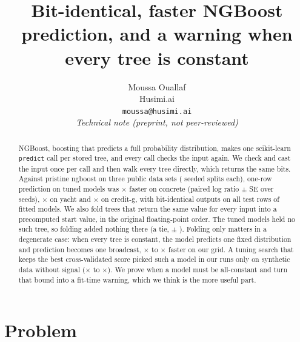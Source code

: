 \documentclass{article}
\title{Bit-identical, faster NGBoost prediction, and a warning when every tree is constant}
\author{%
  Moussa Ouallaf \\
  Husimi.ai \\
  \texttt{moussa@husimi.ai} \\
  \textit{Technical note (preprint, not peer-reviewed)}
}
\begin{document}
\maketitle
\vspace{-1.6em}

\begin{abstract}
NGBoost, boosting that predicts a full probability distribution, makes one scikit-learn \texttt{predict} call per stored tree, and every call checks the input again.
We check and cast the input once per call and then walk every tree directly, which returns the same bits.
Against pristine ngboost \nVerNgboost{} on three public data sets (\nConcreteSeeds{} seeded splits each), one-row prediction on tuned models was \nConcreteOnePristineX$\times$ faster on concrete (paired log ratio \nConcreteOnePristineLog{} $\pm$ \nConcreteOnePristineSE{} SE over seeds), \nYachtOnePristineX$\times$ on yacht and \nCreditGOnePristineX$\times$ on credit-g, with bit-identical outputs on all \nEqRowsTotal{} test rows of \nEqModelsTotal{} fitted models.
We also fold trees that return the same value for every input into a precomputed start value, in the original floating-point order. The tuned models held no such tree, so folding added nothing there (a tie, \nConcreteOneDirectLog{} $\pm$ \nConcreteOneDirectSE).
Folding only matters in a degenerate case: when every tree is constant, the model predicts one fixed distribution and prediction becomes one broadcast, \nCreditGGridDegMinX$\times$ to \nYachtGridDegMaxX$\times$ faster on our grid. A tuning search that keeps the best cross-validated score picked such a model in our runs only on synthetic data without signal (\nLowMinX$\times$ to \nLowMaxX$\times$).
We prove when a model must be all-constant and turn that bound into a fit-time warning, which we think is the more useful part.
\end{abstract}

\section{Problem}
\label{sec:problem}
\end{document}
